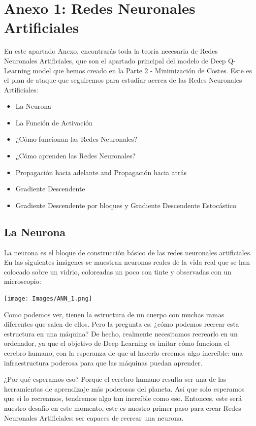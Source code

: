 \documentclass[]{book}
\providecommand{\tightlist}{%
  \setlength{\itemsep}{0pt}\setlength{\parskip}{0pt}}
\begin{document}
\hypertarget{anexo-1-redes-neuronales-artificiales}{%
\section{Anexo 1: Redes Neuronales Artificiales}\label{anexo-1-redes-neuronales-artificiales}}

En este apartado Anexo, encontrarás toda la teoría necesaria de Redes Neuronales Artificiales, que son el apartado principal del modelo de Deep Q-Learning model que hemos creado en la Parte 2 - Minimización de Costes. Este es el plan de ataque que seguiremos para estudiar acerca de las Redes Neuronales Artificiales:

\begin{itemize}
\tightlist
\item
  La Neurona
\item
  La Función de Activación
\item
  ¿Cómo funcionan las Redes Neuronales?
\item
  ¿Cómo aprenden las Redes Neuronales?
\item
  Propagación hacia adelante and Propagación hacia atrás
\item
  Gradiente Descendente
\item
  Gradiente Descendente por bloques y Gradiente Descendente Estocástico
\end{itemize}

\hypertarget{la-neurona}{%
\subsection{La Neurona}\label{la-neurona}}

La neurona es el bloque de construcción básico de las redes neuronales artificiales. En las siguientes imágenes se muestran neuronas reales de la vida real que se han colocado sobre un vidrio, coloreadas un poco con tinte y observadas con un microscopio:

\texttt{[image: Images/ANN\_1.png]}

Como podemos ver, tienen la estructura de un cuerpo con muchas ramas diferentes que salen de ellos. Pero la pregunta es: ¿cómo podemos recrear esta estructura en una máquina? De hecho, realmente necesitamos recrearlo en un ordenador, ya que el objetivo de Deep Learning es imitar cómo funciona el cerebro humano, con la esperanza de que al hacerlo creemos algo increíble: una infraestructura poderosa para que las máquinas puedan aprender.

¿Por qué esperamos eso? Porque el cerebro humano resulta ser una de las herramientas de aprendizaje más poderosas del planeta. Así que solo esperamos que si lo recreamos, tendremos algo tan increíble como eso. Entonces, este será nuestro desafío en este momento, este es nuestro primer paso para crear Redes Neuronales Artificiales: ser capaces de recrear una neurona.
\end{document}
